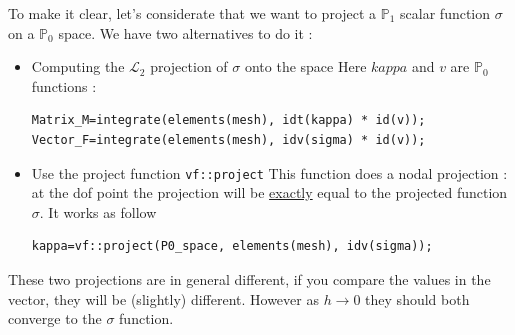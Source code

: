 To make it clear, let's considerate that we want to project a $\mathbb{P}_1$ scalar function $\sigma$ on a $\mathbb{P}_0$ space. We have two alternatives to do it :
\begin{itemize}
\item Computing the $\mathcal{L}_2$ projection of $\sigma$ onto the space \newline
Here $kappa$ and $v$ are $\mathbb{P}_0$ functions :
\begin{lstlisting}
Matrix_M=integrate(elements(mesh), idt(kappa) * id(v));
Vector_F=integrate(elements(mesh), idv(sigma) * id(v));
\end{lstlisting}

\item Use the project function \lstinline!vf::project! \newline
This function does a nodal projection : at the dof point the projection will be \underline{exactly} equal to the projected function $\sigma$. It works as follow
\begin{lstlisting}
kappa=vf::project(P0_space, elements(mesh), idv(sigma));
\end{lstlisting}
\end{itemize}

These two projections are in general different, if you compare the values in the vector, they will be (slightly) different. However as $h \rightarrow 0$ they should both converge to the $\sigma$ function.


